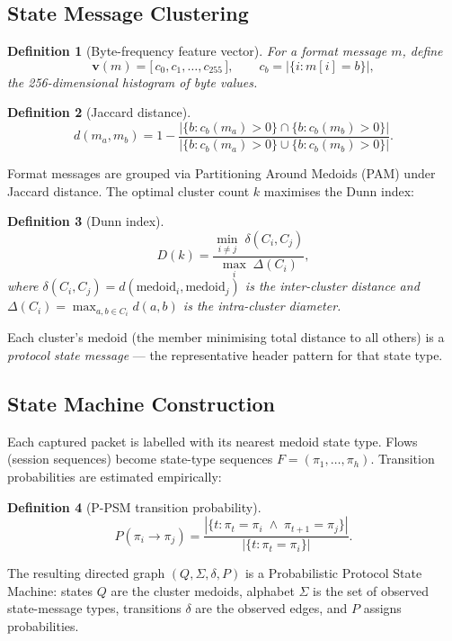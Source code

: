 \documentclass[11pt,a4paper]{article}
\newtheorem{definition}{Definition}
\begin{document}
\subsection{State Message Clustering}

\begin{definition}[Byte-frequency feature vector]
For a format message $m$, define
\[
\mathbf{v}(m) = \bigl[\,c_0, c_1, \dots, c_{255}\,\bigr], \qquad
c_b = |\{i : m[i] = b\}|,
\]
the 256-dimensional histogram of byte values.
\end{definition}

\begin{definition}[Jaccard distance]
\[
d(m_a, m_b) = 1 - \frac{|\{b : c_b(m_a) > 0\} \cap \{b : c_b(m_b) > 0\}|}
                    {|\{b : c_b(m_a) > 0\} \cup \{b : c_b(m_b) > 0\}|}.
\]
\end{definition}

Format messages are grouped via Partitioning Around Medoids (PAM) under
Jaccard distance. The optimal cluster count $k$ maximises the Dunn index:

\begin{definition}[Dunn index]
\[
D(k) = \frac{\min_{i \neq j}\;\delta(C_i, C_j)}
            {\max_{i}\;\Delta(C_i)},
\]
where $\delta(C_i, C_j) = d(\text{medoid}_i, \text{medoid}_j)$ is the
inter-cluster distance and $\Delta(C_i) = \max_{a,b \in C_i} d(a, b)$ is
the intra-cluster diameter.
\end{definition}

Each cluster's medoid (the member minimising total distance to all others)
is a \emph{protocol state message} --- the representative header pattern for
that state type.

\subsection{State Machine Construction}

Each captured packet is labelled with its nearest medoid state type. Flows
(session sequences) become state-type sequences $F = (\pi_1, \dots,
\pi_h)$. Transition probabilities are estimated empirically:

\begin{definition}[P-PSM transition probability]
\[
P(\pi_i \to \pi_j) = \frac{|\{t : \pi_t = \pi_i \;\land\; \pi_{t+1} =
\pi_j\}|}{|\{t : \pi_t = \pi_i\}|}.
\]
\end{definition}

The resulting directed graph $(Q, \Sigma, \delta, P)$ is a Probabilistic
Protocol State Machine: states $Q$ are the cluster medoids, alphabet
$\Sigma$ is the set of observed state-message types, transitions $\delta$
are the observed edges, and $P$ assigns probabilities.
\end{document}
